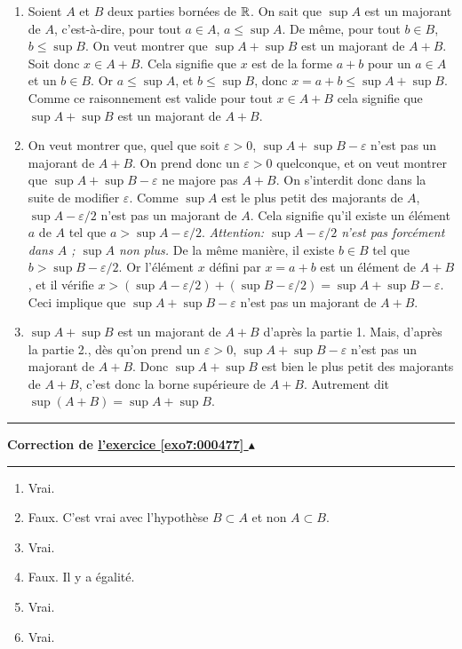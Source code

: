 \documentclass[11pt,a4paper]{article}
\renewcommand{\epsilon}{\varepsilon}
\renewcommand{\le}{\leqslant} \renewcommand{\leq}{\leqslant}
\newcounter{exo}
\newcommand{\correction}[1]{\hypertarget{cor7:#1}{}\label{cor7:#1}{\bf Correction de \hyperlink{exo7:#1}{l'exercice \ref{exo7:#1} $\blacktriangle$}}\vspace{1mm}\hrule\vspace{1mm}}
\newcommand{\fincorrection}{\vspace{1mm}\hrule\vspace*{7mm}}
\begin{document}
\begin{enumerate}

    \item  Soient $A$ et $B$ deux parties born\'ees de $\mathbb{R}$.
On sait que $\sup A$ est un majorant de $A$, c'est-\`a-dire,
pour tout $a\in A$, $a\leqslant \sup A$. De m\^eme, pour tout $b\in B$, $b\le
\sup B$. On veut montrer que $\sup A+\sup B$ est un majorant de
$A+B$. Soit donc $x\in A+B$. Cela signifie que $x$ est de la forme
$a+b$ pour un $a\in A$ et un $b\in B$. Or $a\leqslant \sup A$, et $b \le
\sup B$, donc $x=a+b\leqslant \sup A+\sup B$. Comme ce raisonnement est
valide pour tout $x\in A+B$ cela signifie que  $\sup A+\sup B$ est
un majorant de $A+B$.

    \item On veut montrer que, quel que soit
$\epsilon>0$, $\sup A +\sup B-\epsilon$ n'est pas un majorant de $A+B$. On
prend donc un $\epsilon >0$ quelconque, et on veut montrer que $\sup A
+\sup B-\epsilon$ ne majore pas $A+B$. On s'interdit donc dans la
suite de modifier $\epsilon$. Comme $\sup A$ est le plus petit des
majorants de $A$, $\sup A-\epsilon/2$ n'est pas un majorant de $A$.
Cela signifie qu'il existe un \'el\'ement $a$ de $A$ tel que
$a>\sup A-\epsilon/2$. {\em Attention: $\sup A-\epsilon/2$ n'est pas
forc\'ement dans $A$ ; $\sup A$ non plus.} De la m\^eme mani\`ere, il existe $b\in B$ tel que
$b>\sup B-\epsilon/2$. Or l'\'el\'ement $x$ d\'efini par $x=a+b$ est
un \'el\'ement de $A+B$, et il v\'erifie $x>(\sup A-\epsilon/2)+(\sup
B-\epsilon/2)=\sup A +\sup B-\epsilon.$ Ceci implique que $\sup A +\sup
B-\epsilon$ n'est pas un majorant de $A+B$.

    \item  $\sup A+\sup B$
est un majorant de $A+B$ d'apr\`es la partie 1. Mais, d'apr\`es la
partie 2., d\`es qu'on prend un $\epsilon>0$, $\sup A+\sup B -\epsilon$
n'est pas un majorant de $A+B$. Donc $\sup A+\sup B$ est bien le
plus petit des majorants de $A+B$, c'est donc la borne supérieure de $A+B$. Autrement dit
 $\sup (A+B)= \sup A +\sup B$.
\end{enumerate}
\fincorrection
\correction{000477}
\begin{enumerate}
  \item Vrai.
  \item Faux. C'est vrai avec l'hypothèse $B \subset A$ et non $A \subset B$.
  \item Vrai.
  \item Faux. Il y a égalité.
  \item Vrai.
  \item Vrai.
\end{enumerate}
\end{document}
